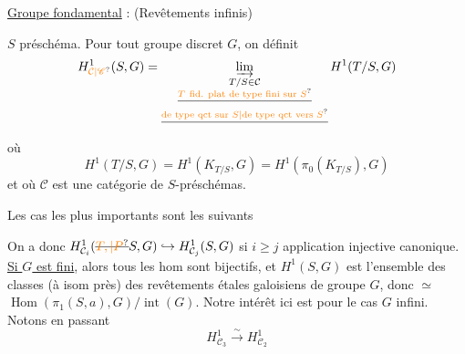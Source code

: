 
\uline{Groupe fondamental} : (Revêtements infinis)

$S$ préschéma. Pour tout groupe discret $G$, on définit
\[
H^1_{\unsure{\mathcal C|\mathscr C}}(S,G)=\varinjlim_{\substack{T/S\in\mathcal C\\ \deleted{\unsure{T\ \text{fid. plat de type fini sur }S}}\\ \deleted{\unsure{\text{de type qct sur }S|\text{de type qct vers }S}}}}H^1(T/S,G)
\]
où
\[
H^1(T/S,G)=H^1(K_{T/S},G)=H^1(\pi_0(K_{T/S}),G)
\]
et où $\mathcal C$ est une catégorie de $S$-préschémas.


Les cas les plus importants sont les suivants


On a donc $H^1_{\mathcal C_i}(\deleted{\unsure{T,|P}}S,G)\hookrightarrow H^1_{\mathcal C_j}(S,G)$ si $i\geq j$
application injective canonique. \uline{Si $G$ est fini},
alors tous les hom sont bijectifs, et $H^1(S,G)$
est l'ensemble des classes (à isom près) des
revêtements étales galoisiens de groupe $G$, donc $\simeq$
$\operatorname{Hom}(\pi_1(S,a),G)/\operatorname{int}(G)$. Notre intérêt ici est pour
le cas $G$ infini. Notons en passant
\[
H^1_{\mathcal C_3}\xrightarrow{\sim}H^1_{\mathcal C_2}
\]

